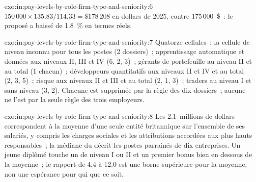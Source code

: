 \begin{solution}{exo:in:pay-levels-by-role-firm-type-and-seniority:6}
$150\,000\times135.83/114.33=\$178\,208$ en dollars de 2025, contre 175\,000~\$~: le  proposé a baissé de 1.8~\% en termes réels.
\end{solution}

\begin{solution}{exo:in:pay-levels-by-role-firm-type-and-seniority:7}
Quatorze cellules~: la cellule de niveau inconnu pour tous les postes (2 dossiers)~; apprentissage automatique et données aux niveaux II, III et IV
(6, 2, 3)~; gérants de portefeuille au niveau II et au total (1 chacun)~; développeurs quantitatifs aux niveaux II et IV et au total (2, 3,
5)~; risque aux niveaux II et III et au total (2, 1, 3)~; traders au niveau I et sans niveau (3, 2). Chacune est supprimée par
la règle des dix dossiers~; aucune ne l'est par la seule règle des trois employeurs.
\end{solution}

\begin{solution}{exo:in:pay-levels-by-role-firm-type-and-seniority:8}
Les 2.1~millions de dollars correspondent à la moyenne d'une seule entité britannique sur l'ensemble de ses salariés, y compris les charges sociales et les attributions accordées aux plus hauts responsables~;
la médiane du  décrit les postes parrainés de dix entreprises. Un jeune diplômé touche un  de niveau I ou II et un premier
bonus bien en dessous de la moyenne~; le rapport de 4.4 à 12.0 est une borne supérieure pour la moyenne, non une espérance pour qui que ce soit.
\end{solution}

